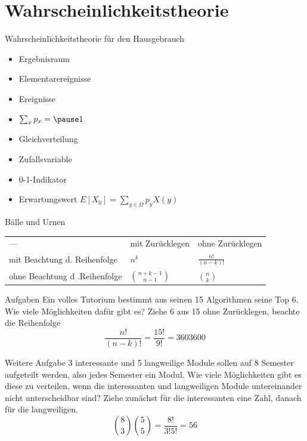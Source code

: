 \documentclass[18pt]{beamer}
\begin{document}
\section{Wahrscheinlichkeitstheorie}
\begin{frame}{Wahrscheinlichkeitstheorie für den Hausgebrauch}
 \begin{itemize}
  \item Ergebnisraum
  \item Elementarereignisse
  \item Ereignisse
  \item $\sum_x p_x = \pause 1$
  \item Gleichverteilung
  \item Zufallsvariable
  \item 0-1-Indikator
  \item Erwartungswert \pause $E[X_0] = \sum_{y \in \Omega} p_y X(y)$
 \end{itemize}

\end{frame}

\begin{frame}{Bälle und Urnen}
 \begin{tabular}{lll}
  --- 				&	mit Zurücklegen 	& ohne Zurücklegen 	\\
 mit Beachtung d. Reihenfolge  	& 	$n^k$			& $\frac{n!}{(n-k)!}$	\\
 ohne Beachtung d .Reihenfolge 	& 	$\binom{n+k-1}{n-1}$	& $\binom{n}{k}$
 \end{tabular}

\end{frame}

\begin{frame}{Aufgaben}
 Ein volles Tutorium bestimmt aus seinen 15 Algorithmen seine Top 6. Wie viele Möglichkeiten dafür gibt es?
 \pause
 Ziehe 6 aus 15 ohne Zurücklegen, beachte die Reihenfolge
 $$ \frac{n!}{(n-k)!} = \frac{15!}{9!} = 3 603 600$$
\end{frame}

\begin{frame}{Weitere Aufgabe}
 3 interessante und 5 langweilige Module sollen auf 8 Semester aufgeteilt werden, also jedes Semester ein Modul. 
 Wie viele Möglichkeiten gibt es diese zu verteilen, wenn die interessanten und langweiligen Module untereinander 
 nicht unterscheidbar sind?
 \pause
 Ziehe zunächst für die interessanten eine Zahl, danach für die langweiligen.
 $$ \binom{8}{3} \binom{5}{5} = \frac{8!}{3! 5!} = 56$$
\end{frame}
\end{document}
